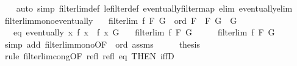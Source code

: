 \begin{isabellebody}
%
\isadelimproof
\ \ %
\endisadelimproof
%
\isatagproof
{}\isamarkupfalse%
\ {\isacharparenleft}{\kern0pt}auto\ simp{\isacharcolon}{\kern0pt}\ filterlim{\isacharunderscore}{\kern0pt}def\ le{\isacharunderscore}{\kern0pt}filter{\isacharunderscore}{\kern0pt}def\ eventually{\isacharunderscore}{\kern0pt}filtermap\ elim{\isacharcolon}{\kern0pt}\ eventually{\isacharunderscore}{\kern0pt}elim{}{\isacharparenright}{\kern0pt}%
\endisatagproof
{\isafoldproof}%
%
\isadelimproof
\isanewline
%
\endisadelimproof
\isanewline
{}\isamarkupfalse%
\ filterlim{\isacharunderscore}{\kern0pt}mono{\isacharunderscore}{\kern0pt}eventually{\isacharcolon}{\kern0pt}\isanewline
\ \ \ {\isachardoublequoteopen}filterlim\ f\ F\ G{\isachardoublequoteclose}\ \ ord{\isacharcolon}{\kern0pt}\ {\isachardoublequoteopen}F\ {\isasymle}\ F{\isacharprime}{\kern0pt}{\isachardoublequoteclose}\ {\isachardoublequoteopen}G{\isacharprime}{\kern0pt}\ {\isasymle}\ G{\isachardoublequoteclose}\isanewline
\ \ \ eq{\isacharcolon}{\kern0pt}\ {\isachardoublequoteopen}eventually\ {\isacharparenleft}{\kern0pt}{\isasymlambda}x{\isachardot}{\kern0pt}\ f\ x\ {\isacharequal}{\kern0pt}\ f{\isacharprime}{\kern0pt}\ x{\isacharparenright}{\kern0pt}\ G{\isacharprime}{\kern0pt}{\isachardoublequoteclose}\isanewline
\ \ \ {\isachardoublequoteopen}filterlim\ f{\isacharprime}{\kern0pt}\ F{\isacharprime}{\kern0pt}\ G{\isacharprime}{\kern0pt}{\isachardoublequoteclose}\isanewline
%
\isadelimproof
%
\endisadelimproof
%
\isatagproof
{}\isamarkupfalse%
\ {\isacharminus}{\kern0pt}\isanewline
\ \ \isamarkupfalse%
\ {\isachardoublequoteopen}filterlim\ f\ F{\isacharprime}{\kern0pt}\ G{\isacharprime}{\kern0pt}{\isachardoublequoteclose}\isanewline
\ \ \ \ \isamarkupfalse%
\ {\isacharparenleft}{\kern0pt}simp\ add{\isacharcolon}{\kern0pt}\ filterlim{\isacharunderscore}{\kern0pt}mono{\isacharbrackleft}{\kern0pt}OF\ {\isacharunderscore}{\kern0pt}\ ord{\isacharbrackright}{\kern0pt}\ assms{\isacharparenright}{\kern0pt}\isanewline
\ \ \isamarkupfalse%
\ \isamarkupfalse%
\ {\isacharquery}{\kern0pt}thesis\isanewline
\ \ \ \ \isamarkupfalse%
\ {\isacharparenleft}{\kern0pt}rule\ filterlim{\isacharunderscore}{\kern0pt}cong{\isacharbrackleft}{\kern0pt}OF\ refl\ refl\ eq{\isacharcomma}{\kern0pt}\ THEN\ iffD{}{\isacharbrackright}{\kern0pt}{\isacharparenright}{\kern0pt}\isanewline
{}\isamarkupfalse%
%
\endisatagproof
{\isafoldproof}%

\end{isabellebody}
